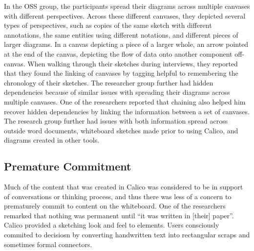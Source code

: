 In the OSS group, the participants spread their diagrams across multiple canvases with different perspectives. Across these different canvases, they depicted several types of perspectives, such as copies of the same sketch with different annotations, the same entities using different notations, and different pieces of larger diagrams. In a canvas depicting a piece of a larger whole, an arrow pointed at the end of the canvas, depicting the flow of data onto another component off-canvas. When walking through their sketches during interviews, they reported that they found the linking of canvases by tagging helpful to remembering the chronology of their sketches. The researcher group further had hidden dependencies because of similar issues with spreading their diagrams across multiple canvases. One of the researchers reported that chaining also helped him recover hidden dependencies by linking the information between a set of canvases. The research group further had issues with both information spread across outside word documents, whiteboard sketches made prior to using Calico, and diagrams created in other tools.

%


\subsection{Premature Commitment}
Much of the content that was created in Calico was considered to be in support of conversations or thinking process, and thus there was less of a concern to prematurely commit to content on the whiteboard. One of the researchers remarked that nothing was permanent until ``it was written in [their] paper''. Calico provided a sketching look and feel to elements. Users consciously commited to decisiosn by converting handwritten text into rectangular scraps and sometimes formal connectors.


